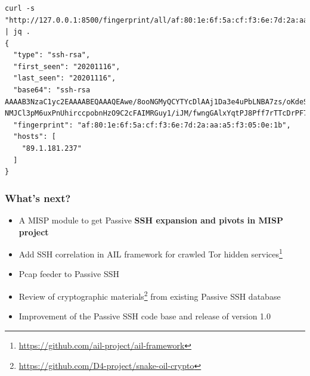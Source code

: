 \documentclass{beamer}
\begin{document}
\begin{frame}[t,fragile]
        \frametitle{}
\lstset{breaklines=true, language=JavaScript}
\begin{lstlisting}
curl -s "http://127.0.0.1:8500/fingerprint/all/af:80:1e:6f:5a:cf:f3:6e:7d:2a:aa:a5:f3:05:0e:1b"  | jq .
{
  "type": "ssh-rsa",
  "first_seen": "20201116",
  "last_seen": "20201116",
  "base64": "ssh-rsa AAAAB3NzaC1yc2EAAAABEQAAAQEAwe/8ooNGMyQCYTYcDlAAj1Da3e4uPbLNBA7zs/oKdeS9JhuJBO5oN0rwKk9B7Y429AL3OHHZUPVQMJ2Rt+fEfObYtLt+BI+289/DYdddUNxX3gU80rF4qiz1uQJ1FjcyW+LN1y219DE9rSshjY6aNPUshDhRuGnBxS
NMJCl3pM6uxPnUhirccpobnHzO9C2cFAIMRGuy1/iJM/fwngGAlxYqtPJ8Pff7rTTcDrPF7YB7STSQXvBTgiwCHVEuxyQaX7Aik5BM0A0DHDrwf6VHDbqWXK6AAM+01W8j1b+lN+yzT4+EZbQJ4kQKfNb8aGWAcHacjs9VOfr4w79ynz/lPQ==",
  "fingerprint": "af:80:1e:6f:5a:cf:f3:6e:7d:2a:aa:a5:f3:05:0e:1b",
  "hosts": [
    "89.1.181.237"
  ]
}
\end{lstlisting}
\end{frame}




\begin{frame}
        \frametitle{What's next?}
        \begin{itemize}
               \item A MISP module to get Passive {\bf SSH expansion and pivots in MISP project}
               \item Add SSH correlation in AIL framework for crawled Tor hidden services\footnote{\url{https://github.com/ail-project/ail-framework}}
               \item Pcap feeder to Passive SSH
               \item Review of cryptographic materials\footnote{\url{https://github.com/D4-project/snake-oil-crypto}} from existing Passive SSH database
               \item Improvement of the Passive SSH code base and release of version 1.0
        \end{itemize}
\end{frame}
\end{document}
